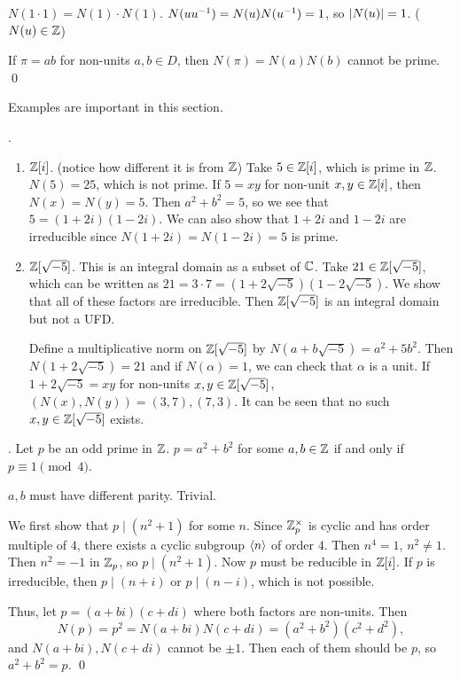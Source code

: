 \pf {} \(N(1 \cdot 1) = N(1) \cdot N(1)\). \(N(u u^{-1}) = N(u) N(u^{-1}) = 1\), so \(\left| N(u) \right| = 1\). (\(N(u) \in \mathbb{Z}\))

 If \(\pi = ab\) for non-units \(a, b \in D\), then \(N(\pi) = N(a)N(b)\) cannot be prime. \qed

Examples are important in this section.

\ex.
\begin{enumerate}
    \item \(\mathbb{Z}[i]\). (notice how different it is from \(\mathbb{Z}\)) Take \(5 \in \mathbb{Z}[i]\), which is prime in \(\mathbb{Z}\). \(N(5) = 25\), which is not prime. If \(5 = xy\) for non-unit \(x, y \in \mathbb{Z}[i]\), then \(N(x) = N(y) = 5\). Then \(a^2 + b^2 = 5\), so we see that \(5 = (1 + 2i)(1 - 2i)\). We can also show that \(1 + 2i\) and \(1 - 2i\) are irreducible since \(N(1 + 2i) = N(1-2i) = 5\) is prime.

    \item \(\mathbb{Z}[\sqrt{-5}]\). This is an integral domain as a subset of \(\mathbb{C}\). Take \(21 \in \mathbb{Z}[\sqrt{-5}]\), which can be written as \(21 = 3 \cdot 7 = (1 + 2\sqrt{-5})(1 - 2\sqrt{-5})\). We show that all of these factors are irreducible. Then \(\mathbb{Z}[\sqrt{-5}]\) is an integral domain but not a UFD.

          Define a multiplicative norm on \(\mathbb{Z}[\sqrt{-5}]\) by \(N(a + b\sqrt{-5}) = a^2 + 5b^2\). Then \(N(1 + 2\sqrt{-5}) = 21\) and if \(N(\alpha) = 1\), we can check that \(\alpha\) is a unit. If \(1 + 2\sqrt{-5} = xy\) for non-units \(x, y \in \mathbb{Z}[\sqrt{-5}]\), \((N(x), N(y)) = (3, 7), (7, 3)\). It can be seen that no such \(x, y \in \mathbb{Z}[\sqrt{-5}]\) exists.
\end{enumerate}

\thm.  Let \(p\) be an odd prime in \(\mathbb{Z}\). \(p = a^2 + b^2\) for some \(a, b \in \mathbb{Z}\) if and only if \(p \equiv 1 \pmod 4\).

\pf \note{\mimp} \(a, b\) must have different parity. Trivial.

\note{\mimpd} We first show that \(p \mid (n^2 + 1)\) for some \(n\). Since \(\mathbb{Z}_p^\times\) is cyclic and has order multiple of \(4\), there exists a cyclic subgroup \(\left\langle n \right\rangle\) of order \(4\). Then \(n^4 = 1\), \(n^2 \neq 1\). Then \(n^2 = -1\) in \(\mathbb{Z}_p\), so \(p \mid (n^2 + 1)\). Now \(p\) must be reducible in \(\mathbb{Z}[i]\). If \(p\) is irreducible, then \(p \mid (n + i)\) or \(p \mid (n - i)\), which is not possible.

Thus, let \(p = (a + bi)(c + di)\) where both factors are non-units. Then
\[
    N(p) = p^2 = N(a + bi)N(c + di) = (a^2 + b^2)(c^2 + d^2),
\]
and \(N(a+bi), N(c+di)\) cannot be \(\pm 1\). Then each of them should be \(p\), so \(a^2 + b^2 = p\). \qed

\pagebreak
